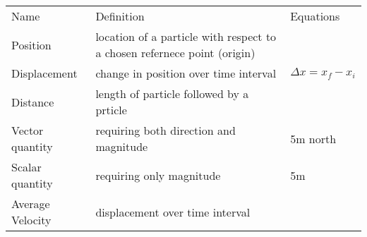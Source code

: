 \documentclass[12pt]{article}
\begin{document}
\begin{table}
	\begin{tabular}{lll}
		Name & Definition & Equations \\
		Position & location of a particle with respect to a chosen refernece point (origin) & \\
		Displacement & change in position over time interval & $ \Delta x=x_{f} - x_{i} $ \\
		Distance & length of particle followed by a prticle & \\
		Vector quantity & requiring both direction and magnitude & 5m north \\
		Scalar quantity & requiring only magnitude & 5m \\
		Average Velocity & displacement over time interval \\
	\end{tabular}
\end{table}
\end{document}
